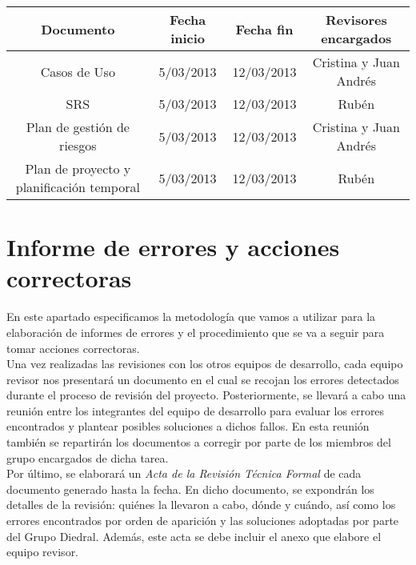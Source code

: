 \documentclass[11pt, a4paper, twoside, titlepage]{article}
\begin{document}
			\begin{center}
			\begin{tabular}{| c | c | c | c |}
				\hline
				\bfseries Documento 	& \bfseries Fecha inicio & \bfseries Fecha fin & \bfseries Revisores encargados	\\ \hline
				Casos de Uso		& 5/03/2013	& 12/03/2013	& Cristina y Juan Andrés	\\ \hline
				SRS 			& 5/03/2013 	& 12/03/2013 	& Rubén				\\ \hline
				Plan de gestión de riesgos & 5/03/2013	& 12/03/2013 	& Cristina y Juan Andrés	\\ \hline
				Plan de proyecto y planificación temporal & 5/03/2013 	& 12/03/2013 & Rubén		\\ \hline
			\end{tabular}
			\end{center}
		
	\section{Informe de errores y acciones correctoras} %
		En este apartado especificamos la metodología que vamos a utilizar para la elaboración de informes de errores y el procedimiento que se va a seguir para tomar acciones correctoras. \\

		Una vez realizadas las revisiones con los otros equipos de desarrollo, cada equipo revisor nos presentará un documento en el cual se recojan los errores detectados durante el proceso de revisión del proyecto. Posteriormente, se llevará a cabo una reunión entre los integrantes del equipo de desarrollo para evaluar los errores encontrados y plantear posibles soluciones a dichos fallos. En esta reunión también se repartirán los documentos a corregir por parte de los miembros del grupo encargados de dicha tarea. \\

		Por último, se elaborará un \textit{Acta de la Revisión Técnica Formal} de cada documento generado hasta la fecha. En dicho documento, se expondrán los detalles de la revisión: quiénes la llevaron a cabo, dónde y cuándo, así como los errores encontrados por orden de aparición %
 y las soluciones adoptadas por parte del Grupo Diedral. Además, este acta se debe incluir el anexo que elabore el equipo revisor.
	
\end{document}
